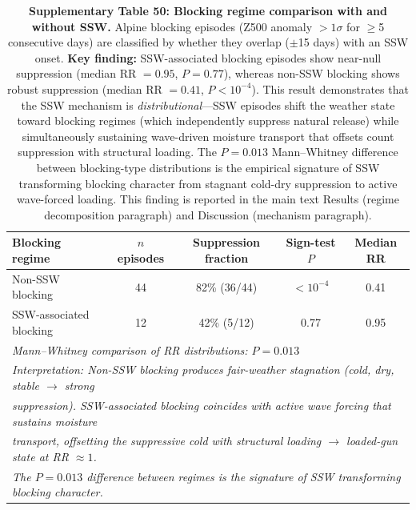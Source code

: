 \documentclass[11pt,letterpaper]{article}
\begin{document}
\begin{table}[!ht]
\centering
\caption{\textbf{Supplementary Table 50: Blocking regime comparison with and without SSW.}
Alpine blocking episodes (Z500 anomaly $> 1\sigma$ for $\geq$5 consecutive days) are classified by whether they overlap ($\pm$15 days) with an SSW onset. \textbf{Key finding:} SSW-associated blocking episodes show near-null suppression (median RR $= 0.95$, $P = 0.77$), whereas non-SSW blocking shows robust suppression (median RR $= 0.41$, $P < 10^{-4}$). This result demonstrates that the SSW mechanism is \emph{distributional}---SSW episodes shift the weather state toward blocking regimes (which independently suppress natural release) while simultaneously sustaining wave-driven moisture transport that offsets count suppression with structural loading. The $P = 0.013$ Mann--Whitney difference between blocking-type distributions is the empirical signature of SSW transforming blocking character from stagnant cold-dry suppression to active wave-forced loading. This finding is reported in the main text Results (regime decomposition paragraph) and Discussion (mechanism paragraph).}
\label{tab:blocking_comparison}
\small
\begin{tabular}{lcccc}
\toprule
\textbf{Blocking regime} & \textbf{$n$ episodes} & \textbf{Suppression fraction} & \textbf{Sign-test $P$} & \textbf{Median RR} \\
\midrule
Non-SSW blocking & 44 & 82\% (36/44) & $< 10^{-4}$ & 0.41 \\
SSW-associated blocking & 12 & 42\% (5/12) & 0.77 & 0.95 \\
\midrule
\multicolumn{5}{l}{\textit{Mann--Whitney comparison of RR distributions: $P = 0.013$}} \\
\multicolumn{5}{l}{\textit{Interpretation: Non-SSW blocking produces fair-weather stagnation (cold, dry, stable $\to$ strong}} \\
\multicolumn{5}{l}{\textit{suppression). SSW-associated blocking coincides with active wave forcing that sustains moisture}} \\
\multicolumn{5}{l}{\textit{transport, offsetting the suppressive cold with structural loading $\to$ loaded-gun state at RR $\approx 1$.}} \\
\multicolumn{5}{l}{\textit{The $P = 0.013$ difference between regimes is the signature of SSW transforming blocking character.}} \\
\bottomrule
\end{tabular}
\end{table}
\end{document}

